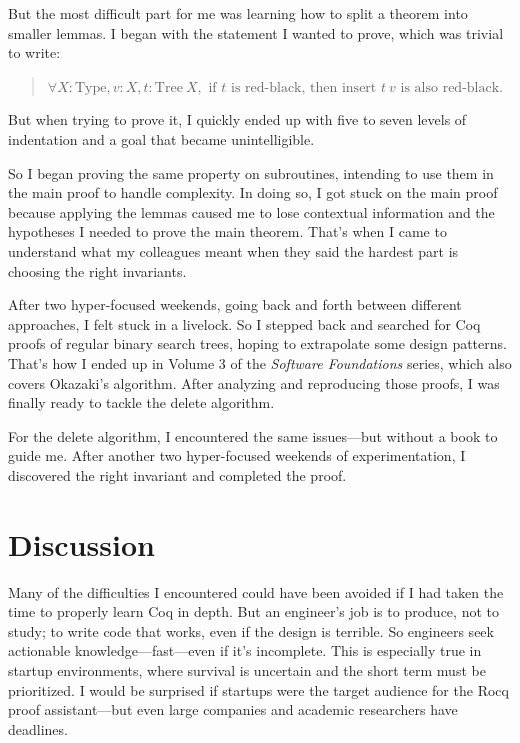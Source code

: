 \documentclass[11pt]{article}
\begin{document}
But the most difficult part for me was learning how to split a theorem into smaller lemmas. I began with the statement I wanted to prove, which was trivial to write:
\begin{quote}
$\forall X : \text{Type}, v : X, t : \text{Tree}\ X, \text{ if } t \text{ is red-black, then } \text{insert } t\ v \text{ is also red-black.}$
\end{quote}

But when trying to prove it, I quickly ended up with five to seven levels of indentation and a goal that became unintelligible.

So I began proving the same property on subroutines, intending to use them in the main proof to handle complexity. In doing so, I got stuck on the main proof because applying the lemmas caused me to lose contextual information and the hypotheses I needed to prove the main theorem. That’s when I came to understand what my colleagues meant when they said the hardest part is choosing the right invariants.

After two hyper-focused weekends, going back and forth between different approaches, I felt stuck in a livelock. So I stepped back and searched for Coq proofs of regular binary search trees, hoping to extrapolate some design patterns. That’s how I ended up in Volume 3 of the \textit{Software Foundations} series, which also covers Okazaki’s algorithm. After analyzing and reproducing those proofs, I was finally ready to tackle the delete algorithm.

For the delete algorithm, I encountered the same issues---but without a book to guide me. After another two hyper-focused weekends of experimentation, I discovered the right invariant and completed the proof.

\section{Discussion}
Many of the difficulties I encountered could have been avoided if I had taken the time to properly learn Coq in depth. But an engineer’s job is to produce, not to study; to write code that works, even if the design is terrible. So engineers seek actionable knowledge---fast---even if it’s incomplete. This is especially true in startup environments, where survival is uncertain and the short term must be prioritized. I would be surprised if startups were the target audience for the Rocq proof assistant---but even large companies and academic researchers have deadlines.
\end{document}
